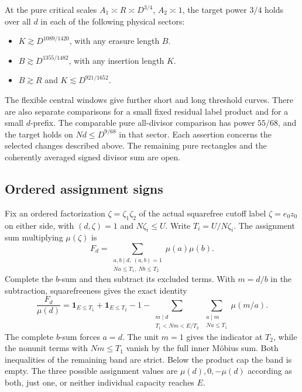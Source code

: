 At the pure critical scales \(A_1\asymp R\asymp D^{3/4}\), \(A_2\asymp1\),
the target power \(3/4\) holds over all \(d\) in each of the following
physical sectors:
\begin{itemize}
\item \(K\gtrsim D^{1089/1420}\), with any erasure length \(B\).
\item \(B\gtrsim D^{1355/1482}\), with any insertion length \(K\).
\item \(B\gtrsim R\) and \(K\lesssim D^{921/1652}\).
\end{itemize}
The flexible central windows give further short and long threshold
curves. There are also separate comparisons for a small fixed residual
label product and for a small \(d\)-prefix. The comparable pure
all-divisor comparison has power \(55/68\), and the target holds on
\(Nd\le D^{9/68}\) in that sector. Each assertion concerns the selected
changes described above. The remaining pure rectangles and the
coherently averaged signed divisor sum are open.

\subsection{Ordered assignment signs}\label{pca:sign}
Fix an ordered factorization \(\zeta=\zeta_1\zeta_2\) of the actual
squarefree cutoff label \(\zeta=e_0z_0\) on either side, with
\((d,\zeta)=1\) and \(N\zeta_i\le U\). Write \(T_i=U/N\zeta_i\). The
assignment sum multiplying \(\mu(\zeta)\) is
\[
 F_d=\sum_{\substack{a,b\mid d,\ (a,b)=1\\Na\le T_1,\ Nb\le T_2}}\mu(a)\mu(b).
\]
Complete the \(b\)-sum and then subtract its excluded terms. With
\(m=d/b\) in the subtraction, squarefreeness gives the exact identity
\begin{equation}\label{pca:ordered}
 \frac{F_d}{\mu(d)}=
 \mathbf1_{E\le T_1}+\mathbf1_{E\le T_2}-1
 -\sum_{\substack{m\mid d\\T_1<Nm<E/T_2}}
      \sum_{\substack{a\mid m\\Na\le T_1}}\mu(m/a).
\end{equation}
The complete \(b\)-sum forces \(a=d\). The unit \(m=1\) gives the
indicator at \(T_2\), while the nonunit terms with \(Nm\le T_1\) vanish by
the full inner M\"obius sum. Both inequalities of the remaining band
are strict. Below the product cap the band is empty. The three possible
assignment values are \(\mu(d),0,-\mu(d)\) according as both, just one,
or neither individual capacity reaches \(E\).

